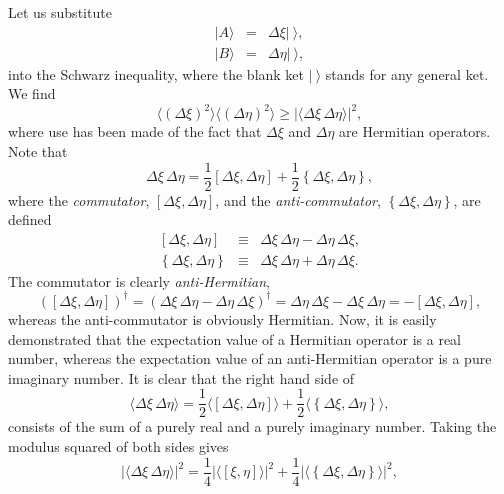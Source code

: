 Let us substitute 
\begin{eqnarray}
|A\rangle &=& \Delta \xi |~\rangle,\\[0.5ex]
|B\rangle &=& \Delta \eta |~\rangle,
\end{eqnarray}
into the Schwarz inequality, where the blank ket $|~\rangle$ stands for any
general ket. We find
\begin{equation}\label{e2.69}
\langle (\Delta \xi)^2\rangle \langle (\Delta \eta)^2\rangle \geq |\langle
\Delta \xi \,\Delta \eta\rangle |^2,
\end{equation}
where use has been made of the fact that $\Delta \xi$ and $\Delta \eta$ are
Hermitian operators. Note that
\begin{equation}
\Delta \xi \,\Delta \eta= \frac{1}{2} \left[ \Delta \xi, \Delta \eta\right]
+\frac{1}{2} \left\{ \Delta \xi, \Delta \eta\right\},
\end{equation} 
where the {\em commutator}, $\left[ \Delta \xi, \Delta \eta\right]$,
and the {\em anti-commutator}, 
$\left\{ \Delta \xi, \Delta \eta\right\}$, are defined
\begin{eqnarray}
\left[ \Delta \xi, \Delta \eta\right]&\equiv & \Delta\xi \,\Delta
\eta -\Delta \eta\, \Delta \xi,\\[0.5ex]
\left\{ \Delta \xi, \Delta \eta\right\}&\equiv & \Delta \xi\, \Delta \eta + 
\Delta\eta \, \Delta\xi.
\end{eqnarray}
The commutator is clearly {\em anti-Hermitian},
\begin{equation}
(\left[ \Delta \xi, \Delta \eta\right])^{\dag} = (\Delta\xi\,
\Delta\eta-\Delta\eta\,\Delta\xi)^{\dag}
= \Delta\eta\,\Delta\xi-\Delta\xi\,
\Delta\eta = - \left[ \Delta \xi, \Delta \eta\right],
\end{equation}
whereas the anti-commutator is obviously Hermitian. Now, it is easily
demonstrated that the expectation value of a Hermitian operator is a real
number, whereas the expectation value of an anti-Hermitian operator is
a pure imaginary number. It is clear that the right hand side of 
\begin{equation}
\langle\Delta \xi \,\Delta \eta\rangle= \frac{1}{2} 
\langle\left[ \Delta \xi, \Delta \eta\right]\rangle
+\frac{1}{2} \langle\left\{ \Delta \xi, \Delta \eta\right\}\rangle,
\end{equation} 
consists of the sum of a purely real and a purely imaginary number. 
Taking the modulus squared of both sides gives
\begin{equation}
|\langle\Delta \xi \,\Delta \eta\rangle|^2= \frac{1}{4} 
|\langle\left[\xi,  \eta\right]\rangle|^2
+\frac{1}{4} |\langle\left\{ \Delta \xi, \Delta \eta\right\}\rangle|^2,
\end{equation}
